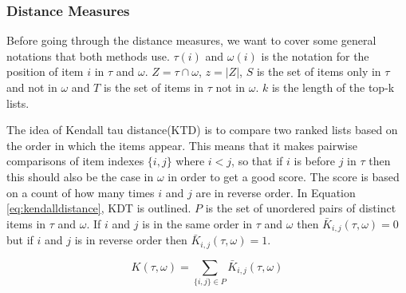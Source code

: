 \subsubsection{Distance Measures}\label{sec:distance}
Before going through the distance measures, we want to cover some general notations that both methods use. $\tau(i)$ and $\omega(i)$ is the notation for the position of item $i$ in $\tau$ and $\omega$. $Z = \tau \cap \omega$, $z=|Z|$, $S$ is the set of items only in $\tau$ and not in $\omega$ and $T$ is the set of items in $\tau$ not in $\omega$. $k$ is the length of the top-k lists.

The idea of Kendall tau distance(KTD) is to compare two ranked lists based on the order in which the items appear\cite{comparing:topk}. This means that it makes pairwise comparisons of item indexes $\{i,j\}$ where $i < j$, so that if $i$ is before $j$ in $\tau$ then this should also be the case in $\omega$ in order to get a good score. The score is based on a count of how many times $i$ and $j$ are in reverse order. In Equation \ref{eq:kendalldistance}, KDT is outlined. $P$ is the set of unordered pairs of distinct items in $\tau$ and $\omega$. If $i$ and $j$ is in the same order in $\tau$ and $\omega$ then $\bar{K}_{i,j}(\tau,\omega) = 0$ but if $i$ and $j$ is in reverse order then $\bar{K}_{i,j}(\tau,\omega) = 1$.	

\begin{equation}\label{eq:kendalldistance}
K(\tau,\omega) = \sum_{\{i,j\} \in P }\bar{K}_{i,j}(\tau,\omega)
\end{equation}


